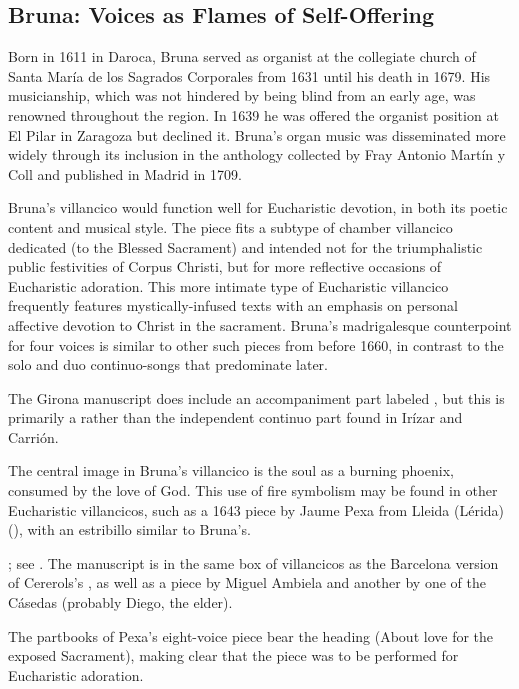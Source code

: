 \subsection{Bruna: Voices as Flames of Self-Offering}

Born in 1611 in Daroca, Bruna served as organist at the collegiate church of
Santa María de los Sagrados Corporales from 1631 until his death in 1679.%
    \Autocite[104]{Calahorra:Aragon}
His musicianship, which was not hindered by being blind from an early age, was
renowned throughout the region.
In 1639 he was offered the organist position at El Pilar in Zaragoza but
declined it.%
    \Autocite[123--125]{Calahorra:Aragon}
Bruna's organ music was disseminated more widely through its inclusion in the
anthology  collected by Fray
Antonio Martín y Coll and published in Madrid in 1709.


Bruna's villancico would function well for Eucharistic devotion, in both its
poetic content and musical style.  
The piece fits a subtype of chamber villancico dedicated  (to the Blessed Sacrament) and intended not for the triumphalistic 
public festivities of Corpus Christi, but for more reflective occasions of
Eucharistic adoration.
This more intimate type of Eucharistic villancico frequently features
mystically-infused texts with an emphasis on personal affective devotion to
Christ in the sacrament.  
Bruna's madrigalesque counterpoint for four voices is similar to other such
pieces from before 1660, in contrast to the solo and duo continuo-songs that
predominate later.%
\begin{Footnote}
    The Girona manuscript does include an accompaniment part labeled
    , but this is primarily a  rather
    than the independent continuo part found in Irízar and Carrión.
\end{Footnote}


The central image in Bruna's villancico is the soul as a burning phoenix,
consumed by the love of God.
This use of fire symbolism may be found in other Eucharistic villancicos, such
as a 1643 piece by Jaume Pexa from Lleida (Lérida)
(), with an estribillo similar to Bruna's.%
\begin{Footnote}
    ; see .
    The manuscript is in the same box of villancicos as the Barcelona version
    of Cererols's , as well as a piece by Miguel
    Ambiela and another by one of the Cásedas (probably Diego, the elder).  
\end{Footnote}
The partbooks of Pexa's eight-voice piece bear the heading  (About love for the exposed Sacrament), making clear that
the piece was to be performed for Eucharistic adoration.  

